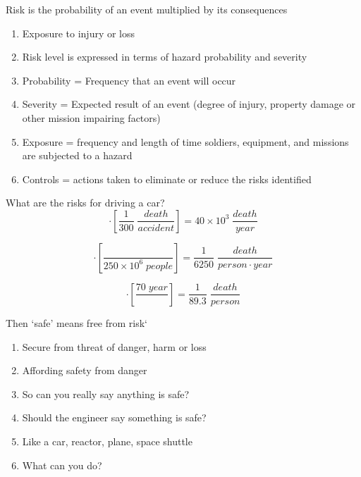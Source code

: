 \documentclass[aspectratio=1610,pdftex,dvipsnames,compress,xcolor={dvipsnames}]{beamer}
\begin{document}
\begin{frame}{Risk is the probability of an event multiplied by its consequences}
    \begin{enumerate}[series=outerlist,topsep=0pt,itemsep=15pt,leftmargin=*,label=(\arabic*)]
        \item[]Exposure to injury or loss
        \item[]Risk level is expressed in terms of hazard probability and severity
        \item[]Probability = Frequency that an event will occur
        \item[]Severity = Expected result of an event (degree of injury, property damage or other mission impairing factors)
        \item[]Exposure = frequency and length of time soldiers, equipment, and missions are subjected to a hazard
        \item[]Controls = actions taken to eliminate or reduce the risks identified
    \end{enumerate}
\end{frame}


\begin{frame}{What are the risks for driving a car?}
    \begin{equation*}
        [120 \times 10^6 \; \frac{accidents}{year}] \cdot [\frac{1}{300} \; \frac{death}{accident}] = 40 \times 10^3 \; \frac{death}{year}
    \end{equation*}

    \vspace{0.25in}

    \begin{equation*}
        [40 \times 10^3 \; \frac{death}{year}] \cdot [\frac{}{250 \times 10^6 \; people}] = \frac{1}{6250} \; \frac{death}{person \cdot year}
    \end{equation*}

    \vspace{0.25in}

    \begin{equation*}
        [\frac{1}{6250} \; \frac{death}{person \cdot year}] \cdot [\frac{70 \; year}{}] = \frac{1}{89.3} \; \frac{death}{person}
    \end{equation*}
\end{frame}


\begin{frame}{Then `safe' means free from risk`}
    \begin{enumerate}[series=outerlist,topsep=0pt,itemsep=15pt,leftmargin=*,label=(\arabic*)]
        \item[]Secure from threat of danger, harm or loss
        \item[]Affording safety from danger
        \item[]So can you really say anything is safe?
        \item[]Should the engineer say something is safe?
        \item[]Like a car, reactor, plane, space shuttle
        \item[]What can you do?
    \end{enumerate}
\end{frame}
\end{document}
